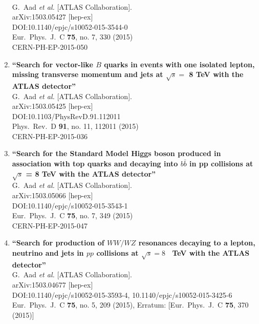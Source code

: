 \documentclass{article}
\begin{document}
\begin{enumerate}
  \\{}G.~Aad {\it et al.} [ATLAS Collaboration].
  \\{}arXiv:1503.05427 [hep-ex]
  \\{}DOI:10.1140/epjc/s10052-015-3544-0
  \\{}Eur.\ Phys.\ J.\ C {\bf 75}, no. 7, 330 (2015)
  \\{}CERN-PH-EP-2015-050
\item%
{\bf ``Search for vector-like $B$ quarks in events with one isolated lepton, missing transverse momentum and jets at $\sqrt{s}=$ 8 TeV with the ATLAS detector''}
  \\{}G.~Aad {\it et al.} [ATLAS Collaboration].
  \\{}arXiv:1503.05425 [hep-ex]
  \\{}DOI:10.1103/PhysRevD.91.112011
  \\{}Phys.\ Rev.\ D {\bf 91}, no. 11, 112011 (2015)
  \\{}CERN-PH-EP-2015-036
\item%
{\bf ``Search for the Standard Model Higgs boson produced in association with top quarks and decaying into $b\bar{b}$ in pp collisions at $\sqrt{s}$ = 8 TeV with the ATLAS detector''}
  \\{}G.~Aad {\it et al.} [ATLAS Collaboration].
  \\{}arXiv:1503.05066 [hep-ex]
  \\{}DOI:10.1140/epjc/s10052-015-3543-1
  \\{}Eur.\ Phys.\ J.\ C {\bf 75}, no. 7, 349 (2015)
  \\{}CERN-PH-EP-2015-047
\item%
{\bf ``Search for production of $WW/WZ$ resonances decaying to a lepton, neutrino and jets in $pp$ collisions at $\sqrt{s}=8$  TeV with the ATLAS detector''}
  \\{}G.~Aad {\it et al.} [ATLAS Collaboration].
  \\{}arXiv:1503.04677 [hep-ex]
  \\{}DOI:10.1140/epjc/s10052-015-3593-4, 10.1140/epjc/s10052-015-3425-6
  \\{}Eur.\ Phys.\ J.\ C {\bf 75}, no. 5, 209 (2015), Erratum: [Eur.\ Phys.\ J.\ C {\bf 75}, 370 (2015)]

\end{enumerate}
\end{document}
